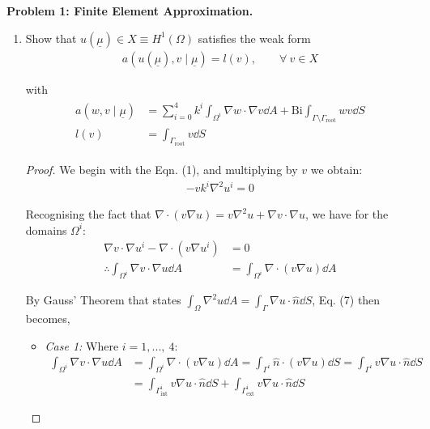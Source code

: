 \textbf{Problem 1: Finite Element Approximation.}

\begin{enumerate}[label=(\alph*),leftmargin=*,itemsep=0mm]
    
    \item Show that $u(\underline{\mu}) \in X\equiv H^1(\Omega)$ satisfies the weak form
    \begin{align}
        a(u(\underline{\mu}),v\mid\underline{\mu}) = l(v),\qquad\forall\>v\in X
    \end{align}
    
    with
    \begin{align}\begin{split}
        a(w,v\mid \underline{\mu})
        &= \sum_{i=0}^4 k^i \int_{\Omega^i} \nabla w\cdot \nabla v \dd{A}
        + \text{Bi} \int_{\Gamma\setminus\Gamma_\text{root}} wv \dd{S} \\
        l(v) &= \int_{\Gamma_\text{root}} v\dd{S}
    \end{split}\end{align}
    
    \begin{proof}
    
    We begin with the Eqn. (1), and multiplying by $v$ we obtain:
    \begin{align*}
        -vk^i\nabla^2u^i = 0
    \end{align*}
    
    Recognising the fact that $\nabla\cdot(v\nabla u) = v\nabla^2u + \nabla v\cdot\nabla u$, we have for the domains $\Omega^i$:
    \begin{align}
        \nabla v \cdot \nabla u^i - \nabla \cdot (v\nabla u^i) &= 0 \nonumber \\
        \therefore \int_{\Omega^i} \nabla v \cdot \nabla u \dd{A}
        &= \int_{\Omega^i} \nabla \cdot (v\nabla u) \dd{A}
    \end{align}
    
    By Gauss' Theorem that states $\int_\Omega \nabla^2 u\dd{A} = \int_\Gamma \nabla u \cdot \hat{n} \dd{S}$, Eq. (7) then becomes, 
    
    \begin{itemize}
        
        \item \textit{Case 1:} Where $i=1, ...,\> 4$:
        \begin{align}
            \int_{\Omega^i} \nabla v \cdot \nabla u \dd{A}
            &= \int_{\Omega^i} \nabla \cdot (v\nabla u) \dd{A} \nonumber
            = \int_{\Gamma^i} \hat{n} \cdot (v\nabla u) \dd{S}
            =  \int_{\Gamma^i} v\nabla u \cdot \hat{n} \dd{S} \nonumber \\
            &= \int_{\Gamma^i_\text{int}} v\nabla u \cdot \hat{n} \dd{S}
            + \int_{\Gamma^i_\text{ext}} v\nabla u \cdot \hat{n} \dd{S}
        \end{align}
        

\end{itemize}
\end{proof}
\end{enumerate}
